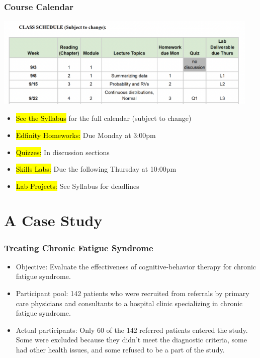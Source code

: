 \documentclass[slidestop,compress,mathserif]{beamer}
\begin{document}
\begin{frame}
	\frametitle{Course Calendar} 
    \begin{center}
        \includegraphics[width=0.95\textwidth]{figures/2025_Calendar.png}
    \end{center}
	\begin{itemize}
		\item \hl{See the Syllabus} for the full calendar (subject to change)
		\item \hl{Edfinity Homeworks:} Due Monday at 3:00pm
		\item \hl{Quizzes:} In discussion sections
		\item \hl{Skills Labs:} Due the following Thursday at 10:00pm
		\item \hl{Lab Projects:} See Syllabus for deadlines
	\end{itemize}
\end{frame}

\section{A Case Study}

\begin{frame}
\frametitle{Treating Chronic Fatigue Syndrome}

\begin{itemize}

\item Objective: Evaluate the effectiveness of cognitive-behavior therapy for chronic fatigue syndrome.

\item Participant pool: 142 patients who were recruited from referrals by primary care physicians and consultants to a hospital clinic specializing in chronic fatigue syndrome.

\item Actual participants: Only 60 of the 142 referred patients entered the study. Some were excluded because they didn't meet the diagnostic criteria, some had other health issues, and some refused to be a part of the study.

\end{itemize}


\end{frame}
\end{document}
